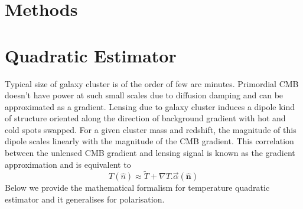 \section{Methods}
\label{sec_method}
\section{Quadratic Estimator}

Typical size of galaxy cluster is of the order of few arc minutes. 
Primordial CMB doesn't have power at such small scales due to diffusion damping \cite{Silk} and can be approximated as a gradient. 
Lensing due to galaxy cluster induces a dipole kind of structure oriented along the direction of background gradient with hot and cold spots swapped.
For a given cluster mass and redshift, the magnitude of this dipole scales linearly with the magnitude of the CMB gradient.
This correlation between the unlensed CMB gradient and lensing signal is known as the gradient approximation and is equivalent to
\begin{equation}
T (\hat{n})\approx \tilde{T}+ \nabla T . \vec{\alpha}(\hat{\textbf{n}})
\end{equation}
Below we provide the mathematical formalism for temperature quadratic estimator and it generalises for polarisation.


